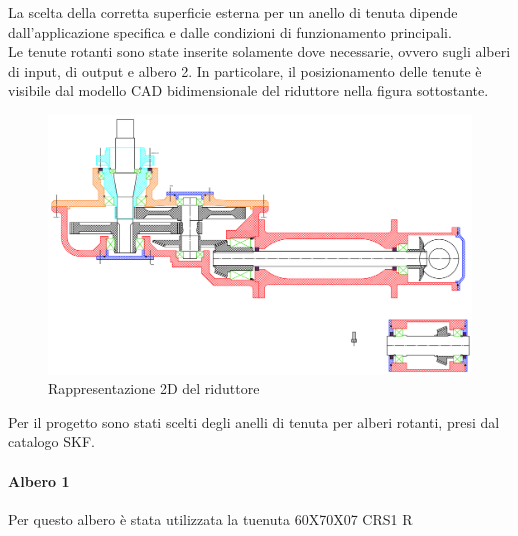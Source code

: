 La scelta della corretta superficie esterna per un anello di tenuta dipende dall'applicazione specifica e dalle condizioni di funzionamento principali.\\
\newpage
Le tenute rotanti sono state inserite solamente dove necessarie, ovvero sugli alberi di
input, di output e albero 2. In particolare, il posizionamento delle tenute è visibile dal modello CAD bidimensionale del riduttore nella figura sottostante.
\begin{figure}[h]
    \centering
    \includegraphics[scale=0.5]{Immagini/Riduttore2D.png} %
    \caption{Rappresentazione 2D del riduttore}
    \label{fig:Riduttore2D}
\end{figure}

Per il progetto sono stati scelti degli anelli di tenuta per alberi rotanti, presi dal catalogo SKF.
\newpage
\paragraph{Albero 1}
Per questo albero è stata utilizzata la tuenuta 60X70X07 CRS1 R

